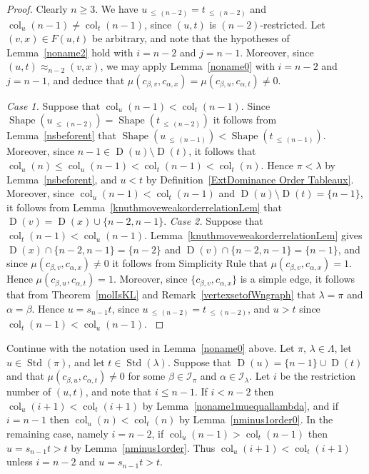 \documentclass[ALCO,ThmDefs,Unicode,epreuves]{cedram}
\newenvironment{Case}[1]{\smallskip\noindent\emph{Case #1}\endgraf
 \nobreak\noindent\ignorespaces}{\endgraf\smallskip}
\DeclareMathOperator{\col}{col}
\newcommand{\Lessthan}[2]{#1\,{_{\leqslant\,#2}}}
\DeclareMathOperator{\STD}{Std}
\DeclareMathOperator{\shape}{Shape}
\DeclareMathOperator{\D}{D}
\begin{document}
\begin{proof}
Clearly $n\geqslant 3$. We have $\Lessthan u{(n-2)} = \Lessthan t{(n-2)}$
and $\col_u(n-1) \neq \col_t(n-1)$, since $(u,t)$ is $(n-2)$-restricted.
Let $(v,x)\in F(u,t)$ be arbitrary, and note that the hypotheses
of Lemma~\ref{noname2} hold with $i=n-2$ and $j=n-1$. Moreover, since
$(u,t)\approx_{n-2}(v,x)$, we may apply Lemma~\ref{noname0} with $i=n-2$ and
$j=n-1$, and deduce that
$\mu(c_{\beta,v},c_{\alpha,x})=\mu(c_{\beta,u},c_{\alpha,t}) \neq 0$.

\begin{Case}{1.}Suppose that $\col_u(n-1)<\col_t(n-1)$. Since
$\shape(\Lessthan u{(n-2)})=\shape(\Lessthan t{(n-2)})$
it follows from Lemma~\ref{nsbeforent} that
$\shape(\Lessthan u{(n-1)})<\shape(\Lessthan t{(n-1)})$. Moreover, since
$n-1\in\D(u)\setminus\D(t)$, it follows that
$\col_u(n)\leqslant\col_u(n-1)<\col_t(n-1)<\col_t(n)$. Hence $\pi<\lambda$
by Lemma~\ref{nsbeforent}, and $u<t$ by Definition~\ref{ExtDominance Order Tableaux}.
Moreover, since $\col_u(n-1)<\col_t(n-1)$ and $\D(u)\setminus\D(t)=\{n-1\}$, it
follows from Lemma~\ref{knuthmoveweakorderrelationLem} that
$\D(v)=\D(x)\cup\{n-2,n-1\}$.
\end{Case}
\begin{Case}{2.}Suppose that $\col_t(n-1)<\col_u(n-1)$. Lemma~\ref{knuthmoveweakorderrelationLem}
gives $\D(x)\cap\{n-2,n-1\}=\{n-2\}$ and $\D(v)\cap\{n-2,n-1\}=\{n-1\}$, and since
$\mu(c_{\beta,v},c_{\alpha,x})\ne0$ it follows from
Simplicity Rule
that $\mu(c_{\beta,v},c_{\alpha,x})=1$.
Hence $\mu(c_{\beta,u},c_{\alpha,t})=1$. Moreover, since $\{c_{\beta,v},c_{\alpha,x}\}$ is a
simple edge, it follows that from Theorem~\ref{molIsKL} and Remark~\ref{vertexsetofWngraph}
that $\lambda=\pi$ and $\alpha=\beta$. Hence $u=s_{n-1}t$, since
$\Lessthan u{(n-2)} = \Lessthan t{(n-2)}$, and $u>t$ since $\col_t(n-1)<\col_u(n-1)$.
\qedhere
\end{Case}
\end{proof}

\begin{rema}\label{nminus1iplusonest}
Continue with the notation used in Lemma~\ref{noname0} above. Let
$\pi,\,\lambda\in\Lambda$, let $u\in\STD(\pi)$, and let $t\in\STD(\lambda)$.
Suppose that $\D(u) = \{n-1\} \cup \D(t)$ and that $\mu(c_{\beta,u},c_{\alpha,t}) \neq 0$
for some $\beta\in\mathcal{I}_{\pi}$ and $\alpha\in\mathcal{I}_{\lambda}$. Let
$i$ be the restriction number of $(u,t)$, and note that $i\leqslant n-1$. If $i<n-2$ then
$\col_u(i+1)<\col_t(i+1)$ by Lemma~\ref{noname1muequallambda}, and if $i=n-1$ then
$\col_u(n)<\col_t(n)$ by Lemma~\ref{nminus1order0}. In the remaining case, namely
$i=n-2$, if $\col_u(n-1)>\col_t(n-1)$ then $u=s_{n-1}t>t$ by
Lemma~\ref{nminus1order}. Thus $\col_u(i+1)<\col_t(i+1)$
unless $i=n-2$ and $u=s_{n-1}t>t$.
\end{rema}
\end{document}
